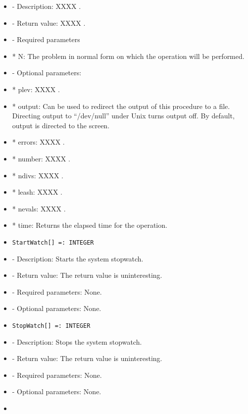 \begin{itemize}
\bd
\item
- Description:  XXXX .
\item
- Return value:  XXXX .
\item
- Required parameters

\bd
\item
*  N:  The problem in normal form on which the operation will be performed.
\ed

\item
- Optional parameters:
	
\bd
\item
*  plev: XXXX .
\item
*  output:  Can be used to redirect the output of this procedure to a
file.  Directing output to ``/dev/null'' under Unix turns 
output off.  By default, output is directed to the screen.
\item
*  errors:  XXXX .
\item
*  number:  XXXX .
\item 
*  ndivs:  XXXX .
\item
*  leash:  XXXX .
\item
*  nevals:  XXXX .
\item
*  time:  Returns the elapsed time for the operation.

\ed

\item
\begin{verbatim}
StartWatch[] =: INTEGER
\end{verbatim}

\bd
\item
- Description:  Starts the system stopwatch.  
\item
- Return value:  The return value is uninteresting.
\item
- Required parameters:  None.
\item
- Optional parameters:  None.
\ed

\item
\begin{verbatim}
StopWatch[] =: INTEGER
\end{verbatim}

\bd
\item
- Description:  Stops the system stopwatch.  
\item
- Return value:  The return value is uninteresting.
\item
- Required parameters:  None.
\item
- Optional parameters:  None.
\ed

\item


\end{itemize}
